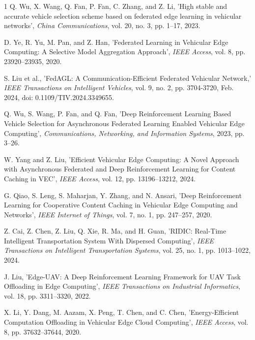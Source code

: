 \documentclass[journal]{IEEEtran}
\begin{document}
\begin{thebibliography}{1}
 Q. Wu, X. Wang, Q. Fan, P. Fan, C. Zhang, and Z. Li, 'High stable and accurate vehicle selection scheme based on federated edge learning in vehicular networks',\textit{ China Communications}, vol. 20, no. 3, pp. 1–17, 2023.

 D. Ye, R. Yu, M. Pan, and Z. Han, 'Federated Learning in Vehicular Edge Computing: A Selective Model Aggregation Approach', \textit{IEEE Access}, vol. 8, pp. 23920–23935, 2020.

 S. Liu et al., 'FedAGL: A Communication-Efficient Federated Vehicular Network,'\textit{ IEEE Transactions on Intelligent Vehicles}, vol. 9, no. 2, pp. 3704-3720, Feb. 2024, doi: 0.1109/TIV.2024.3349655.

 Q. Wu, S. Wang, P. Fan, and Q. Fan, 'Deep Reinforcement Learning Based Vehicle Selection for Asynchronous Federated Learning Enabled Vehicular Edge Computing',  \textit{Communications, Networking, and Information Systems}, 2023, pp. 3–26.

W. Yang and Z. Liu, 'Efficient Vehicular Edge Computing: A Novel Approach with Asynchronous Federated and Deep Reinforcement Learning for Content Caching in VEC', \textit{IEEE Access}, vol. 12, pp. 13196–13212, 2024.

G. Qiao, S. Leng, S. Maharjan, Y. Zhang, and N. Ansari, 'Deep Reinforcement Learning for Cooperative Content Caching in Vehicular Edge Computing and Networks', \textit{IEEE Internet of Things}, vol. 7, no. 1, pp. 247–257, 2020.

Z. Cai, Z. Chen, Z. Liu, Q. Xie, R. Ma, and H. Guan, 'RIDIC: Real-Time Intelligent Transportation System With Dispersed Computing',\textit{ IEEE Transactions on Intelligent Transportation Systems}, vol. 25, no. 1, pp. 1013–1022, 2024.



 J. Liu, 'Edge-UAV: A Deep Reinforcement Learning Framework for UAV Task Offloading in Edge Computing',\textit{ IEEE Transactions on Industrial Informatics}, vol. 18, pp. 3311–3320, 2022.

 X. Li, Y. Dang, M. Aazam, X. Peng, T. Chen, and C. Chen, 'Energy-Efficient Computation Offloading in Vehicular Edge Cloud Computing', \textit{IEEE Access}, vol. 8, pp. 37632–37644, 2020.


\end{thebibliography}
\end{document}
